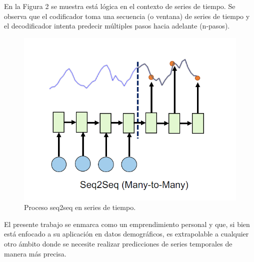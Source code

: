 \documentclass[
11pt, %
]{charter}
\begin{document}
En la Figura 2 se muestra está lógica en el contexto de series de tiempo. Se observa que el codificador toma una secuencia (o ventana) de series de tiempo y el decodificador intenta predecir múltiples pasos hacia adelante (n-pasos).

\begin{figure}[htpb]
	\centering 
	\includegraphics[width=.65\textwidth]{./Figuras/Fig2.png}
	\caption{Proceso seq2seq en series de tiempo.}
	\label{fig:diagBloques}
\end{figure}

El presente trabajo se enmarca como un emprendimiento personal y que, si bien está enfocado a su aplicación en datos demográficos, es extrapolable a cualquier otro ámbito donde se necesite realizar predicciones de series temporales de manera más precisa.
\end{document}
